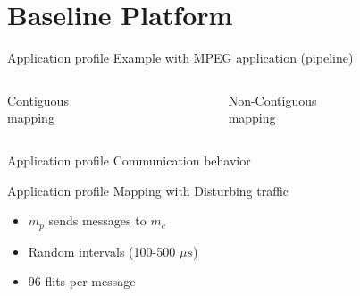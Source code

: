 \section{Baseline Platform}

\begin{frame}{Application profile}
    \centering Example with MPEG application (pipeline)
    \begin{figure}[!ht]
        \centering
        \resizebox{.5\linewidth}{!}{
            
        }
    \end{figure}
    
    \vspace{10pt}
    \begin{columns}
        \centering Contiguous mapping
        \begin{figure}
            \centering
            \resizebox{.4\linewidth}{!}{
                
            }
        \end{figure}

        \centering Non-Contiguous mapping
        \begin{figure}
            \centering
            \resizebox{.5\linewidth}{!}{
                
            }
        \end{figure}
    \end{columns}
\end{frame}

\begin{frame}{Application profile}
    \centering Communication behavior

    \begin{figure}[!ht]
        \centering
        \resizebox{.75\linewidth}{!}{
            
        }
    \end{figure}
\end{frame}

\begin{frame}{Application profile}
    \centering Mapping with Disturbing traffic
    \begin{figure}
        \centering
        
    \end{figure}

    \begin{itemize}
        \item $m_p$ sends messages to $m_c$
        \item Random intervals (100-500 $\mu s$)
        \item 96 flits per message        
    \end{itemize}
\end{frame}

